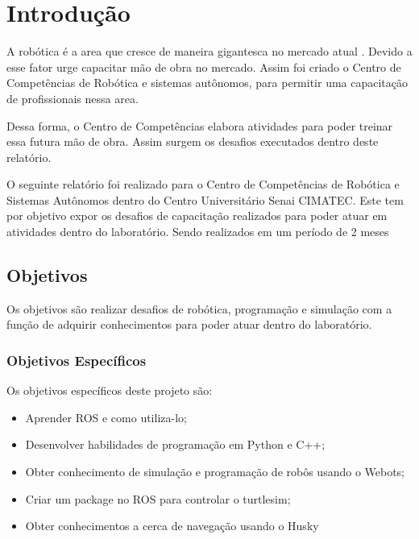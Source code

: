 \chapter{Introdução}
\label{chap:intro}
A robótica é a area que cresce de maneira gigantesca no mercado atual \cite{Robótica93:online}. Devido a esse fator urge capacitar mão de obra no mercado. Assim foi criado o Centro de Competências de Robótica e sistemas autônomos, para permitir uma capacitação de profissionais nessa area.

Dessa forma, o Centro de Competências elabora atividades para poder treinar essa futura mão de obra. Assim surgem os desafios executados dentro deste relatório.

O seguinte relatório foi realizado para o Centro de Competências de Robótica e Sistemas Autônomos dentro do Centro Universitário Senai CIMATEC. Este tem por objetivo expor os desafios de capacitação realizados para poder atuar em atividades dentro do laboratório. Sendo realizados em um período de 2 meses



\section{Objetivos}
\label{sec:obj}
Os objetivos são realizar desafios de robótica, programação e simulação com a função de adquirir conhecimentos para poder atuar dentro do laboratório.
\label{sec:obj}

\subsection{Objetivos Específicos}
\label{ssec:objesp}
Os objetivos específicos deste projeto são:
\begin{itemize}
      \item Aprender ROS e como utiliza-lo;
      \item Desenvolver habilidades de programação em Python e C++;
      \item Obter conhecimento de simulação e programação de robôs usando o Webots;
      \item Criar um package no ROS para controlar o turtlesim;
      \item Obter conhecimentos a cerca de navegação usando o Husky
  \end{itemize}

